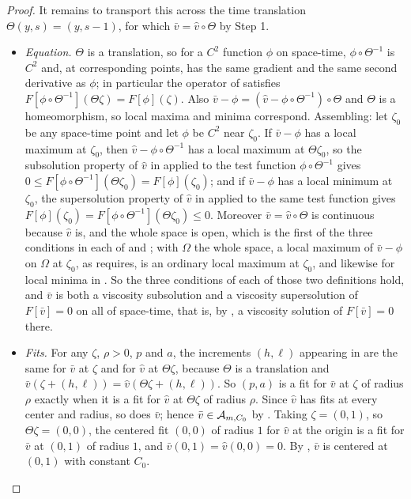 \begin{proof}
It remains to transport this across the time translation
$\Theta(y,s)=(y,s-1)$, for which $\bar v=\widehat v\circ\Theta$ by Step 1.
\begin{itemize}
\item \emph{Equation.} $\Theta$ is a translation, so for a $C^2$ function $\phi$
on space-time, $\phi\circ\Theta^{-1}$ is $C^2$ and, at corresponding points, has
the same gradient and the same second derivative as $\phi$; in particular the
operator of  satisfies
$F[\phi\circ\Theta^{-1}](\Theta\zeta)=F[\phi](\zeta)$. Also
$\bar v-\phi=(\widehat v-\phi\circ\Theta^{-1})\circ\Theta$ and $\Theta$ is a
homeomorphism, so local maxima and minima correspond. Assembling: let $\zeta_0$
be any space-time point and let $\phi$ be $C^2$ near $\zeta_0$. If
$\bar v-\phi$ has a local maximum at $\zeta_0$, then
$\widehat v-\phi\circ\Theta^{-1}$ has a local maximum at $\Theta\zeta_0$, so the
subsolution property of $\widehat v$ in  applied to the
test function $\phi\circ\Theta^{-1}$ gives
$0\le F[\phi\circ\Theta^{-1}](\Theta\zeta_0)=F[\phi](\zeta_0)$; and if
$\bar v-\phi$ has a local minimum at $\zeta_0$, the supersolution property of
$\widehat v$ in  applied to the same test function gives
$F[\phi](\zeta_0)=F[\phi\circ\Theta^{-1}](\Theta\zeta_0)\le0$. Moreover
$\bar v=\widehat v\circ\Theta$ is continuous because $\widehat v$ is, and the
whole space is open, which is the first of the three conditions in each of
 and ; with $\Omega$ the whole
space, a local maximum of $\bar v-\phi$ on $\Omega$ at $\zeta_0$, as
 requires, is an ordinary local maximum at $\zeta_0$, and
likewise for local minima in . So the three conditions
of each of those two definitions hold, and $\bar v$ is both a viscosity
subsolution and a viscosity supersolution of $F[\bar v]=0$ on all of space-time,
that is, by , a viscosity solution of $F[\bar v]=0$
there.
\item \emph{Fits.} For any $\zeta$, $\rho>0$, $p$ and $a$, the increments
$(h,\ell)$ appearing in  are the same for $\bar v$ at $\zeta$ and
for $\widehat v$ at $\Theta\zeta$, because $\Theta$ is a translation and
$\bar v(\zeta+(h,\ell))=\widehat v(\Theta\zeta+(h,\ell))$. So $(p,a)$ is a fit
for $\bar v$ at $\zeta$ of radius $\rho$ exactly when it is a fit for
$\widehat v$ at $\Theta\zeta$ of radius $\rho$. Since $\widehat v$ has fits at
every center and radius, so does $\bar v$; hence
$\bar v\in\mathcal{A}_{m,C_0}$ by . Taking
$\zeta=(0,1)$, so $\Theta\zeta=(0,0)$, the centered fit $(0,0)$ of radius $1$
for $\widehat v$ at the origin is a fit for $\bar v$ at $(0,1)$ of radius $1$,
and $\bar v(0,1)=\widehat v(0,0)=0$. By , $\bar v$ is
centered at $(0,1)$ with constant $C_0$.
\end{itemize}


\end{proof}
